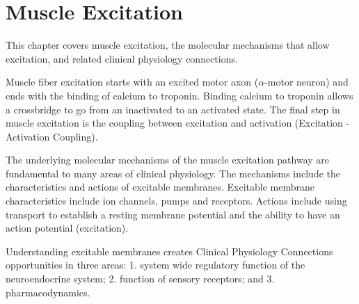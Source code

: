 \chapter{Muscle Excitation}\label{chp:excitation}




\minitoc

This chapter covers muscle excitation, the molecular mechanisms that allow excitation, and related clinical physiology connections. 

Muscle fiber excitation starts with an excited motor axon ($\alpha$-motor neuron) and ends with the binding of calcium to troponin. Binding calcium to troponin allows a crossbridge to go from an inactivated to an activated state. The final step in muscle excitation is the coupling between excitation and activation (Excitation - Activation Coupling). 

The underlying molecular mechanisms of the muscle excitation pathway are fundamental to many areas of clinical physiology. The mechanisms include the characteristics and actions of excitable membranes. Excitable membrane characteristics include ion channels, pumps and receptors. Actions include using transport to establish a resting membrane potential and the ability to have an action potential (excitation). 

Understanding excitable membranes creates Clinical Physiology Connections opportunities in three areas: 1. system wide regulatory function of the neuroendocrine system; 2. function of sensory receptors; and 3. pharmacodynamics.

\vspace{5mm}

